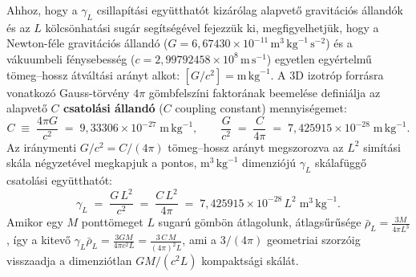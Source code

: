 \documentclass[10pt,a4paper]{article}
\begin{document}
\par
Ahhoz, hogy a $\gamma_L$ csillap\'it\'asi egy\"utthat\'ot kiz\'ar\'olag alapvet\H{o} gravit\'aci\'os \'alland\'ok \'es az $L$ k\"olcs\"onhat\'asi sug\'ar seg\'its\'eg\'evel fejezz\"uk ki, megfigyelhetj\"uk, hogy a Newton-f\'ele gravit\'aci\'os \'alland\'o ($G = 6{,}67430\times 10^{-11}\,\text{m}^3\,\text{kg}^{-1}\,\text{s}^{-2}$) \'es a v\'akuumbeli f\'enysebess\'eg ($c = 2{,}99792458\times 10^{8}\,\text{m}\,\text{s}^{-1}$) egyetlen egy\'ertelm\H{u} t\"omeg--hossz \'atvált\'asi ar\'anyt alkot: $[G/c^2] = \text{m}\,\text{kg}^{-1}$. A 3D izotr\'op forr\'asra vonatkoz\'o Gauss-t\"orv\'eny $4\pi$ g\"ombfelsz\'ini faktor\'anak beemel\'ese defini\'alja az alapvet\H{o} \textbf{$C$ csatol\'asi \'alland\'o} ($C$ coupling constant) mennyis\'egemet:
\begin{equation}
  C \;\equiv\; \frac{4\pi G}{c^2} \;=\; 9{,}33306\times 10^{-27}\;\text{m}\,\text{kg}^{-1}, \qquad
  \frac{G}{c^2} \;=\; \frac{C}{4\pi} \;=\; 7{,}425915\times 10^{-28}\;\text{m}\,\text{kg}^{-1}.
\end{equation}
Az ir\'anymenti $G/c^2 = C/(4\pi)$ t\"omeg--hossz ar\'anyt megszorozva az $L^2$ sim\'it\'asi sk\'ala n\'egyzet\'evel megkapjuk a pontos, $\text{m}^3\,\text{kg}^{-1}$ dimenzi\'oj\'u $\gamma_L$ sk\'alaf\"ugg\H{o} csatol\'asi egy\"utthat\'ot:
\begin{equation}
  \gamma_L \;=\; \frac{G\,L^2}{c^2} \;=\; \frac{C\,L^2}{4\pi} \;=\; 7{,}425915\times 10^{-28}\,L^2\;\text{m}^3\,\text{kg}^{-1}.
\end{equation}
Amikor egy $M$ pontt\"omeget $L$ sugar\'u g\"omb\"on \'atlagolunk, \'atlags\H{u}r\H{u}s\'ege $\bar{\rho}_L = \frac{3M}{4\pi L^3}$, \'igy a kitev\H{o} $\gamma_L \bar{\rho}_L = \frac{3GM}{4\pi c^2 L} = \frac{3\,C\,M}{(4\pi)^2 L}$, ami a $3/(4\pi)$ geometriai szorz\'oig visszaadja a dimenzi\'otlan $GM/(c^2 L)$ kompakts\'agi sk\'al\'at.
\end{document}
